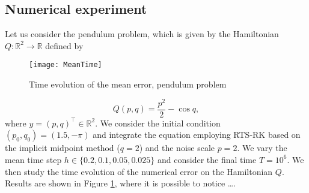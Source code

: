 \documentclass{siamart1116}
\numberwithin{theorem}{section}
\newcommand{\R}{\mathbb{R}}
\newcommand{\OO}{\mathcal{O}}
\newcommand{\Var}{\operatorname{Var}}
\begin{document}
\subsection{Numerical experiment} Let us consider the pendulum problem, which is given by the Hamiltonian $Q \colon \R^2 \to \R$ defined by

\begin{figure}[t]
	\centering
	\texttt{[image: MeanTime]}
	\caption{Time evolution of the mean error, pendulum problem}
	\label{fig:MeanTime}	
\end{figure}

\begin{equation}
Q(p, q) = \frac{p^2}{2} - \cos q,
\end{equation}
where $y = (p, q)^\top \in \R^2$. We consider the initial condition $(p_0, q_0) = (1.5, -\pi)$ and integrate the equation employing RTS-RK based on the implicit midpoint method ($q = 2$) and the noise scale $p = 2$. We vary the mean time step $h \in \{0.2, 0.1, 0.05, 0.025\}$ and consider the final time $T = 10^6$. We then study the time evolution of the numerical error on the Hamiltonian $Q$. Results are shown in Figure \ref{fig:MeanTime}, where it is possible to notice \ldots.



%



\end{document}
